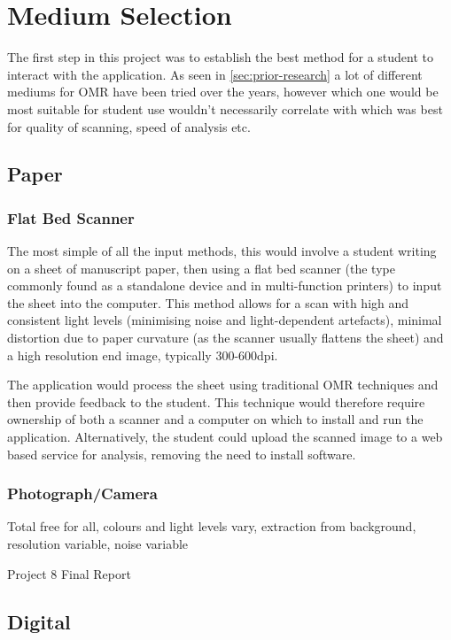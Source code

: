 \section{Medium Selection}

The first step in this project was to establish the best method for a student to interact with the application. As seen in \ref{sec:prior-research} a lot of different mediums for OMR have been tried over the years, however which one would be most suitable for student use wouldn't necessarily correlate with which was best for quality of scanning, speed of analysis etc.

\subsection{Paper}
\subsubsection{Flat Bed Scanner}

The most simple of all the input methods, this would involve a student writing on a sheet of manuscript paper, then using a flat bed scanner (the type commonly found as a standalone device and in multi-function printers) to input the sheet into the computer. This method allows for a scan with high and consistent light levels (minimising noise and light-dependent artefacts), minimal distortion due to paper curvature (as the scanner usually flattens the sheet) and a high resolution end image, typically 300-600dpi.

The application would process the sheet using traditional OMR techniques and then provide feedback to the student. This technique would therefore require ownership of both a scanner and a computer on which to install and run the application. Alternatively, the student could upload the scanned image to a web based service for analysis, removing the need to install software.

\subsubsection{Photograph/Camera}

Total free for all, colours and light levels vary, extraction from background, resolution variable, noise variable

Project 8 Final Report

\subsection{Digital}

